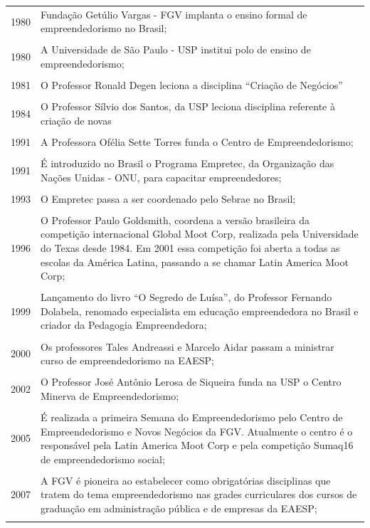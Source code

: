 \begin{longtable}{lp{11cm}}
1980 & Fundação Getúlio Vargas - FGV implanta o ensino formal de empreendedorismo no Brasil;  \\\\\hline
1980 & A Universidade de São Paulo - USP institui polo de ensino de empreendedorismo;  \\\\\hline
1981 & O Professor Ronald Degen leciona a disciplina “Criação de Negócios”  \\\\ \hline
1984 & O Professor Sílvio dos Santos, da USP leciona disciplina referente à criação de novas \\\\ \hline
1991 & A Professora Ofélia Sette Torres funda o Centro de Empreendedorismo;  \\\\\hline
1991 & É introduzido no Brasil o Programa Empretec, da Organização das Nações Unidas - ONU, para
capacitar empreendedores;  \\\\\hline
1993 & O Empretec passa a ser coordenado pelo Sebrae no Brasil;  \\\\ \hline
1996 & O Professor Paulo Goldsmith, coordena a versão brasileira da competição internacional Global Moot Corp, realizada pela Universidade do Texas desde 1984. Em 2001 essa competição foi aberta a todas as escolas da América Latina, passando a se chamar Latin America Moot Corp;\\\\ \hline
1999 & Lançamento do livro “O Segredo de Luísa”, do Professor Fernando Dolabela, renomado
especialista em educação empreendedora no Brasil e criador da Pedagogia Empreendedora;  \\\\ \hline
2000 & Os professores Tales Andreassi e Marcelo Aidar passam a ministrar curso de empreendedorismo
na EAESP;  \\\\ \hline
2002 & O Professor José Antônio Lerosa de Siqueira funda na USP o Centro Minerva de Empreendedorismo;  \\\\\hline 
 2005 & É realizada a primeira Semana do Empreendedorismo pelo Centro de Empreendedorismo e Novos Negócios da FGV. Atualmente o centro é o responsável pela Latin America Moot Corp e pela competição Sumaq16 de empreendedorismo social;  \\\\ \hline 
 2007 & A FGV é pioneira ao estabelecer como obrigatórias disciplinas que tratem do tema empreendedorismo nas grades curriculares dos cursos de graduação em administração pública e de empresas da EAESP; \\\\ \hline

\end{longtable}


